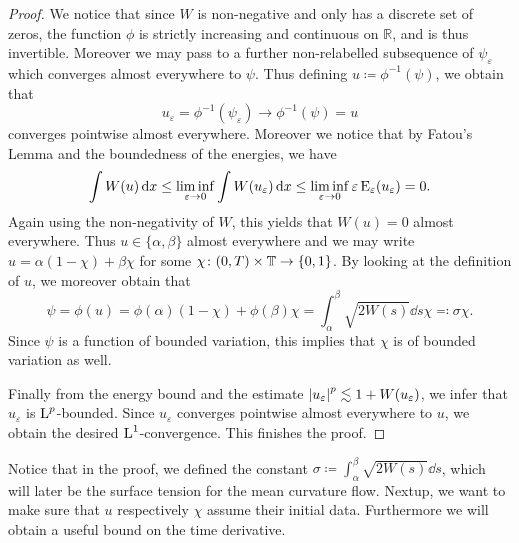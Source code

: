 \begin{proof}
	We notice that since $ W $ is non-negative and only has a discrete set of zeros, the function $ \phi $ is strictly increasing and continuous on $ \mathbb{ R } $, and is thus invertible. Moreover we may pass to a further non-relabelled subsequence of $ \psi_{ \varepsilon } $ which converges almost everywhere to $ \psi $. 
	Thus defining $ u \coloneqq \phi^{ - 1 } ( \psi ) $, we obtain that
	\begin{equation*}
		u_{ \varepsilon } = \phi^{ - 1 } ( \psi_{ \varepsilon } ) \to \phi^{ - 1 } ( \psi ) = u
	\end{equation*}
	converges pointwise almost everywhere.
	Moreover we notice that by Fatou's Lemma and the boundedness of the 
	energies, we have
	\begin{equation*}
		\int
		W ( u ) 
		\dd{ x }
		\leq
		\liminf_{ \varepsilon \to 0 }
		\int
		W ( u_{ \varepsilon } )
		\dd{ x }
		\leq
		\liminf_{ \varepsilon \to 0 }
		\varepsilon \operatorname{E}_{ \varepsilon } ( u_{ \varepsilon } )
		=
		0.
	\end{equation*}
	Again using the non-negativity of $ W $, this yields that $ W ( u ) = 0 $ almost everywhere. 
	Thus $ u \in \{ \alpha , \beta \} $ almost everywhere and we may write $ u = \alpha ( 1 - \chi ) + \beta \chi $ for some $ \chi \colon ( 0 , T ) \times \operatorname{\mathbb{T}} \to \{ 0 , 1 \} $.
	By looking at the definition of $ u $, we moreover obtain that 
	\begin{equation}
		\label{represenation_of_psi}
		\psi = \phi ( u ) = 
		\phi ( \alpha ) ( 1 - \chi )
		+ 
		\phi ( \beta )	\chi
		= 
		\int_{ \alpha }^{ \beta } \sqrt{ 2 W ( s ) } \dd{ s } \chi 
		\eqqcolon
		\sigma \chi.
	\end{equation}
	Since $ \psi $ is a function of bounded variation, this implies that $ \chi 
	$ is of bounded variation as well.
	
	Finally from the energy bound and the estimate $ \abs{ u_{ \varepsilon } 
	}^{ p } \lesssim 1 + W ( u_{ \varepsilon } ) $, we infer that $ u_{ 
	\varepsilon } $ is $ 
	\operatorname{L}^{ p }$-bounded. Since $ u_{ \varepsilon } $ converges pointwise 
	almost everywhere to $ u $, we obtain the desired $ \operatorname{L}^{ 1 } $-convergence.
	This finishes the proof.
\end{proof}

Notice that in the proof, we defined the constant $ \sigma \coloneqq \int_{ 
\alpha }^{ \beta } \sqrt{ 2 W ( s ) } \dd{ s } $, which will later be the 
surface tension for the mean curvature flow.
Nextup, we want to make sure that $ u $ respectively $ \chi $ assume their 
initial data.
Furthermore we will obtain a useful bound on the time derivative.

